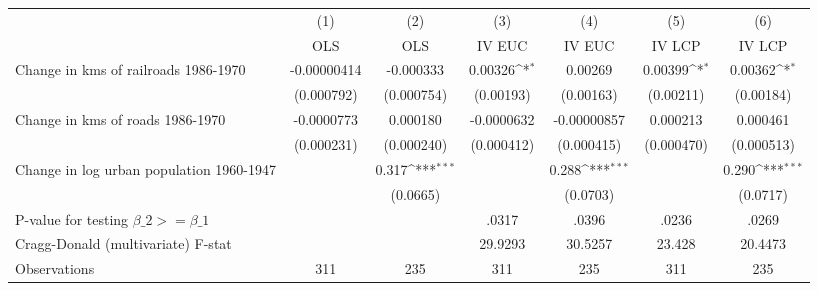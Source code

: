 {
\def\sym#1{\ifmmode^{#1}\else\(^{#1}\)\fi}
\begin{tabular}{l*{6}{c}}
\hline\hline
                &\multicolumn{1}{c}{(1)}&\multicolumn{1}{c}{(2)}&\multicolumn{1}{c}{(3)}&\multicolumn{1}{c}{(4)}&\multicolumn{1}{c}{(5)}&\multicolumn{1}{c}{(6)}\\
                &\multicolumn{1}{c}{OLS}&\multicolumn{1}{c}{OLS}&\multicolumn{1}{c}{IV EUC}&\multicolumn{1}{c}{IV EUC}&\multicolumn{1}{c}{IV LCP}&\multicolumn{1}{c}{IV LCP}\\
\hline
Change in kms of railroads 1986-1970&-0.00000414         &-0.000333         &  0.00326\sym{*}  &  0.00269         &  0.00399\sym{*}  &  0.00362\sym{*}  \\
                &(0.000792)         &(0.000754)         &(0.00193)         &(0.00163)         &(0.00211)         &(0.00184)         \\
[1em]
Change in kms of roads 1986-1970&-0.0000773         & 0.000180         &-0.0000632         &-0.00000857         & 0.000213         & 0.000461         \\
                &(0.000231)         &(0.000240)         &(0.000412)         &(0.000415)         &(0.000470)         &(0.000513)         \\
[1em]
Change in log urban population 1960-1947&                  &    0.317\sym{***}&                  &    0.288\sym{***}&                  &    0.290\sym{***}\\
                &                  & (0.0665)         &                  & (0.0703)         &                  & (0.0717)         \\
\hline
P-value for testing $\beta\_{2} >= \beta\_{1}$&                  &                  &    .0317         &    .0396         &    .0236         &    .0269         \\
Cragg-Donald (multivariate) F-stat&                  &                  &  29.9293         &  30.5257         &   23.428         &  20.4473         \\
Observations    &      311         &      235         &      311         &      235         &      311         &      235         \\
\hline\hline
\end{tabular}
}
